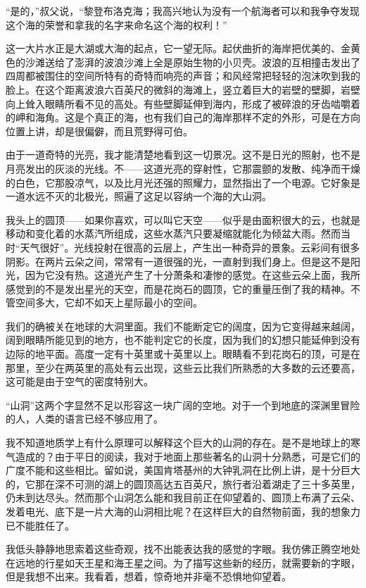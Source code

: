 \documentclass[10pt]{book}
\begin{document}
“是的，”叔父说，“黎登布洛克海；我高兴地认为没有一个航海者可以和我争夺发现这个海的荣誉和拿我的名字来命名这个海的权利！”

这一大片水正是大湖或大海的起点，它一望无际。起伏曲折的海岸把优美的、金黄色的沙滩送给了澎湃的波浪沙滩上全是原始生物的小贝壳。波浪的互相撞击发出了四周都被围住的空间所特有的奇特而响亮的声音；和风经常把轻轻的泡沫吹到我的脸上。在这个距离波浪六百英尺的微斜的海滩上，竖立着巨大的岩壁的壁脚，岩壁向上耸入眼睛所看不见的高处。有些壁脚延伸到海内，形成了被碎浪的牙齿啮嚼着的岬和海角。这是个真正的海，也有我们自己的海岸那样不定的外形，可是在方向位置上讲，却是很偏僻，而且荒野得可伯。

由于一道奇特的光亮，我才能清楚地看到这一切景况。这不是日光的照射，也不是月亮发出的灰淡的光线。不——这道光亮的穿射性，它那震颤的发散、纯净而干燥的白色，它那股凉气，以及比月光还强的照耀力，显然指出了一个电源。它好象是一道水远不灭的北极光，照遍了这足以容纳一个海的大山洞。

我头上的圆顶——如果你喜欢，可以叫它天空——似乎是由面积很大的云，也就是移动和变化着的水蒸汽所组成，这些水蒸汽只要凝缩就能化为倾盆大雨。然而当时“天气很好”。光线投射在很高的云层上，产生出一种奇异的景象。云彩间有很多阴影。在两片云朵之间，常常有一道很强的光，一直射到我们身上。但是这不是阳光，因为它没有热。这道光产生了十分萧条和凄惨的感觉。在这些云朵上面，我所感觉到的不是发出星光的天空，而是花岗石的圆顶，它的重量压倒了我的精神。不管空间多大，它却不如天上星际最小的空间。

我们的确被关在地球的大洞里面。我们不能断定它的阔度，因为它变得越来越阔，阔到眼睛所能见到的地方，也不能判定它的长度，因为我们的幻想只能延伸到没有边际的地平面。高度一定有十英里或十英里以上。眼睛看不到花岗石的顶，可是在那里，至少在两英里的高处有云出现，这些云比我们所熟悉的大多数的云还要高，这可能是由于空气的密度特别大。

“山洞”这两个字显然不足以形容这一块广阔的空地。对于一个到地底的深渊里冒险的人，人类的语言已经不够应用了。

我不知道地质学上有什么原理可以解释这个巨大的山洞的存在。是不是地球上的寒气造成的？由于平日的阅读，我对于地面上那些著名的山洞十分熟悉，可是它们的广度不能和这些相比。留如说，美国肯塔基州的大钟乳洞在比例上讲，是十分巨大的，它那在深不可测的湖上的圆顶高达五百英尺，旅行者沿着湖走了三十多英里，仍未到达尽头。然而那个山洞怎么能和我目前正在仰望着的、圆顶上布满了云朵、发着电光、底下是一片大海的山洞相比呢？在这样巨大的自然物前面，我的想象力已不能胜任了。

我低头静静地思索着这些奇观，找不出能表达我的感觉的字眼。我仿佛正腾空地处在远地的行星如天王星和海王星之间。为了描写这些新的经历，就需要新的字眼，但是我想不出来。我看着，想着，惊奇地并非毫不恐惧地仰望着。
\end{document}
